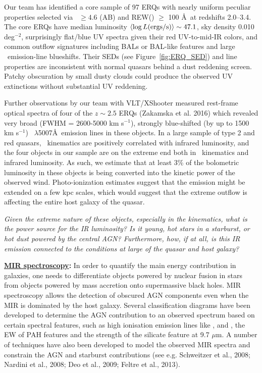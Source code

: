 \vspace{-22pt}
\noindent
Our team has identified a core sample of 97 ERQs with nearly uniform
peculiar properties selected via \imw\ $\ge 4.6$ (AB) and REW(\civ )
$\ge$ 100 \AA\ at redshifts 2.0--3.4.  The core ERQs have median
luminosity $\left<\log L ({\rm ergs/s})\right> \sim 47.1$, sky density
0.010 deg$^{-2}$, surprisingly flat/blue UV spectra given their red
UV-to-mid-IR colors, and common outflow signatures including BALs or
BAL-like features and large \civ\ emission-line blueshifts. Their
SEDs (see Figure~\ref{fig:ERQ_SED}) and line properties are
inconsistent with normal quasars behind a dust reddening
screen. Patchy obscuration by small dusty clouds could produce the
observed UV extinctions without substantial UV reddening.


\smallskip
\smallskip
\noindent
Further observations by our team with VLT/XShooter measured rest-frame
optical spectra of four of the $z\sim 2.5$ ERQs (Zakamska et al. 2016) 
which revealed very broad (FWHM = 2600-5000 km
s$^{-1}$), strongly blue-shifted (by up to 1500 km s$^{-1}$)
\oiii\ $\lambda$5007\AA\ emission lines in these objects. In a large
sample of type 2 and red quasars, \oiii\ kinematics are positively
correlated with infrared luminosity, and the four objects in our
sample are on the extreme end both in \oiii\ kinematics and infrared
luminosity.
As such, we estimate that at least 3\% of the bolometric luminosity in
these objects is being converted into the kinetic power of the
observed wind. Photo-ionization estimates suggest that the \oiii
emission might be extended on a few kpc scales, which would suggest
that the extreme outflow is affecting the entire host galaxy of the
quasar.

\smallskip
\smallskip
\noindent
{\it Given the extreme nature of these objects, especially in the 
kinematics,  what is the power source for the IR luminosity? 
Is it young, hot stars in a starburst, or hot dust powered by the central AGN?
Furthermore, how, if at all, is this IR emission connected to the
conditions at large of the quasar and host galaxy?}

\smallskip
\smallskip
\noindent
{\bf \underline{MIR spectroscopy}:}
In order to quantify the main energy contribution in galaxies, one
needs to differentiate objects powered by nuclear fusion in stars 
from objects powered by mass accretion onto supermassive black holes.
MIR spectroscopy allows the detection of obscured AGN components even
when the MIR is dominated by the host galaxy. Several classification
diagrams have been developed to determine the AGN contribution to an
observed spectrum based on certain spectral features, such as high
ionisation emission lines like \nev, \neii and \oiv, the EW of PAH
features and the strength of the silicate feature at 9.7 $\mu$m. A number of techniques have
also been developed to model the observed MIR spectra and constrain
the AGN and starburst contributions (see e.g. Schweitzer et al., 2008;
Nardini et al., 2008; Deo et al., 2009; Feltre et al., 2013).

